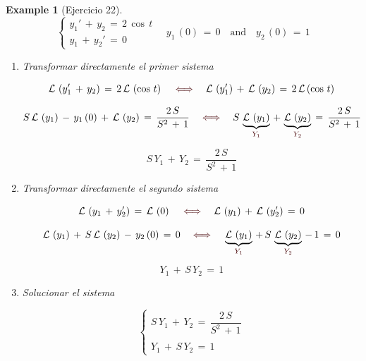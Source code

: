 \documentclass[a4paper,11pt,openany]{book}
\newtheorem{exmp}{Example}[section]
\newcommand*{\itembolasazules}[1]{%
\footnotesize\protect\tikz[baseline=-3pt]%
\protect\node[scale=.7, circle, shade, ball
color=green]{\color{white}\Large\bf#1};}
\begin{document}
\begin{exmp}[Ejercicio 22]
 
$$
\left\{
\begin{array}{lll}
y_{1}'\,+\,y_{2}\,=\,2\,\cos\,t \\
y_{1}\,+\,y_{2}'\,=\,0
\end{array}
\right.
\quad y_{1}\,(0)\,=\,0 \quad \text{and} \quad y_{2}\,(0)\,=\,1$$
 
\begin{enumerate}[label=\itembolasazules{\arabic*}]
 
 
\item Transformar directamente el primer sistema
 
$$\mathcal{L}\,\left(y_{1}'\,+\,y_{2} \right)\,=\,2\,\mathcal{L}\,\left(\cos\,t \right) \quad \textcolor{bulgarianrose}{\iff} \quad \mathcal{L}\,\left(y_{1}' \right)\,+\,\mathcal{L}\,\left(y_{2} \right)\,=\,2\,\mathcal{L}\left(\cos\,t \right)$$
 
$$S\,\mathcal{L}\,\left(y_{1} \right)\,-\,y_{1}\,(0)\,+\,\mathcal{L}\,\left(y_{2} \right)\,=\,\dfrac{2\,S}{S^{2}\,+\,1} \quad \textcolor{bulgarianrose}{\iff} \quad S\,\underbrace{\mathcal{L}\,\left(y_{1} \right)}_{\textcolor{bulgarianrose}{Y_{1} } }\,+\,\underbrace{\mathcal{L}\,\left(y_{2} \right)}_{\textcolor{bulgarianrose}{Y_{2} } }\,=\,\dfrac{2\,S}{S^{2}\,+\,1}$$
 
$$\boxed{S\,Y_{1}\,+\,Y_{2}\,=\,\dfrac{2\,S}{S^{2}\,+\,1} }$$
 
\item Transformar directamente el segundo sistema
 
$$\mathcal{L}\,\left(y_{1}\,+\,y_{2}' \right)\,=\,\mathcal{L}\,\left(0 \right) \quad \textcolor{bulgarianrose}{\iff} \quad \mathcal{L}\,\left(y_{1} \right)\,+\,\mathcal{L}\,\left(y_{2}' \right)\,=\,0$$
 
$$\mathcal{L}\,\left(y_{1} \right)\,+\,S\,\mathcal{L}\,\left(y_{2} \right)\,-\,y_{2}\,(0)\,=\,0 \quad \textcolor{bulgarianrose}{\iff} \quad \underbrace{\mathcal{L}\,\left(y_{1} \right)}_{\textcolor{bulgarianrose}{Y_{1} } }\,+\,S\,\underbrace{\mathcal{L}\,\left(y_{2} \right)}_{\textcolor{bulgarianrose}{Y_{2} } }\,-\,1\,=\,0$$
 
$$\boxed{Y_{1}\,+\,S\,Y_{2}\,=\,1 }$$
 
\item Solucionar el sistema 
 
$$\begin{cases}
S\,Y_{1}\,+\,Y_{2}\,=\,\dfrac{2\,S}{S^{2}\,+\,1} \\
\\
Y_{1}\,+\,S\,Y_{2}\,=\,1
\end{cases}$$
 

\end{enumerate}
\end{exmp}
\end{document}
